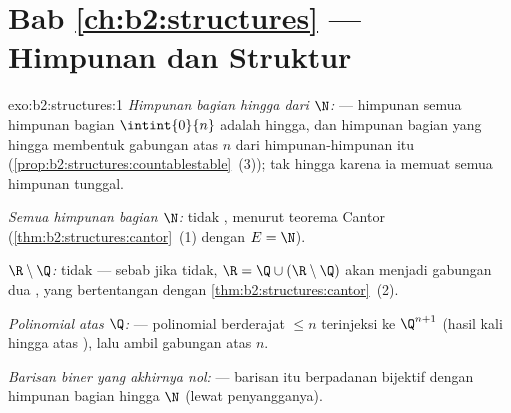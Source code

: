 \section*{Bab \ref{ch:b2:structures} --- Himpunan dan Struktur}

\begin{solution}{exo:b2:structures:1}
\emph{Himpunan bagian hingga dari $\N$:}  --- himpunan semua
himpunan bagian $\intint{0}{n}$ adalah hingga, dan himpunan bagian yang
hingga membentuk gabungan  atas $n$ dari himpunan-himpunan itu
(\cref{prop:b2:structures:countablestable}~(3)); tak hingga karena ia
memuat semua himpunan tunggal.

\emph{Semua himpunan bagian $\N$:} tidak , menurut teorema
Cantor (\cref{thm:b2:structures:cantor}~(1) dengan $E = \N$).

\emph{$\R \setminus \Q$:} tidak  --- sebab jika tidak, $\R = \Q
\cup (\R\setminus\Q)$ akan menjadi gabungan dua , yang
bertentangan dengan \cref{thm:b2:structures:cantor}~(2).

\emph{Polinomial atas $\Q$:}  --- polinomial berderajat
$\leq n$ terinjeksi ke $\Q^{n+1}$ (hasil kali hingga atas ), lalu ambil gabungan atas $n$.

\emph{Barisan biner yang akhirnya nol:}  --- barisan itu
berpadanan bijektif dengan himpunan bagian hingga $\N$ (lewat penyangganya).
\end{solution}

